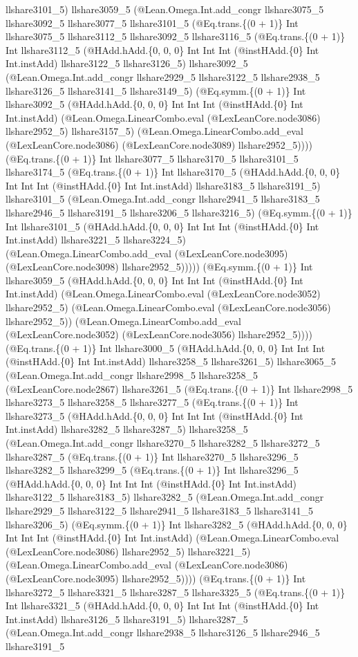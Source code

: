 \documentclass[11pt]{article}
\begin{document}
llshare3101\_5) llshare3059\_5 (@Lean.Omega.Int.add\_congr llshare3075\_5 llshare3092\_5 llshare3077\_5 llshare3101\_5 (@Eq.trans.\{(0 + 1)\} Int llshare3075\_5 llshare3112\_5 llshare3092\_5 llshare3116\_5 (@Eq.trans.\{(0 + 1)\} Int llshare3112\_5 (@HAdd.hAdd.\{0, 0, 0\} Int Int Int (@instHAdd.\{0\} Int Int.instAdd) llshare3122\_5 llshare3126\_5) llshare3092\_5 (@Lean.Omega.Int.add\_congr llshare2929\_5 llshare3122\_5 llshare2938\_5 llshare3126\_5 llshare3141\_5 llshare3149\_5) (@Eq.symm.\{(0 + 1)\} Int llshare3092\_5 (@HAdd.hAdd.\{0, 0, 0\} Int Int Int (@instHAdd.\{0\} Int Int.instAdd) (@Lean.Omega.LinearCombo.eval (@LexLeanCore.node3086) llshare2952\_5) llshare3157\_5) (@Lean.Omega.LinearCombo.add\_eval (@LexLeanCore.node3086) (@LexLeanCore.node3089) llshare2952\_5)))) (@Eq.trans.\{(0 + 1)\} Int llshare3077\_5 llshare3170\_5 llshare3101\_5 llshare3174\_5 (@Eq.trans.\{(0 + 1)\} Int llshare3170\_5 (@HAdd.hAdd.\{0, 0, 0\} Int Int Int (@instHAdd.\{0\} Int Int.instAdd) llshare3183\_5 llshare3191\_5) llshare3101\_5 (@Lean.Omega.Int.add\_congr llshare2941\_5 llshare3183\_5 llshare2946\_5 llshare3191\_5 llshare3206\_5 llshare3216\_5) (@Eq.symm.\{(0 + 1)\} Int llshare3101\_5 (@HAdd.hAdd.\{0, 0, 0\} Int Int Int (@instHAdd.\{0\} Int Int.instAdd) llshare3221\_5 llshare3224\_5) (@Lean.Omega.LinearCombo.add\_eval (@LexLeanCore.node3095) (@LexLeanCore.node3098) llshare2952\_5))))) (@Eq.symm.\{(0 + 1)\} Int llshare3059\_5 (@HAdd.hAdd.\{0, 0, 0\} Int Int Int (@instHAdd.\{0\} Int Int.instAdd) (@Lean.Omega.LinearCombo.eval (@LexLeanCore.node3052) llshare2952\_5) (@Lean.Omega.LinearCombo.eval (@LexLeanCore.node3056) llshare2952\_5)) (@Lean.Omega.LinearCombo.add\_eval (@LexLeanCore.node3052) (@LexLeanCore.node3056) llshare2952\_5)))) (@Eq.trans.\{(0 + 1)\} Int llshare3000\_5 (@HAdd.hAdd.\{0, 0, 0\} Int Int Int (@instHAdd.\{0\} Int Int.instAdd) llshare3258\_5 llshare3261\_5) llshare3065\_5 (@Lean.Omega.Int.add\_congr llshare2998\_5 llshare3258\_5 (@LexLeanCore.node2867) llshare3261\_5 (@Eq.trans.\{(0 + 1)\} Int llshare2998\_5 llshare3273\_5 llshare3258\_5 llshare3277\_5 (@Eq.trans.\{(0 + 1)\} Int llshare3273\_5 (@HAdd.hAdd.\{0, 0, 0\} Int Int Int (@instHAdd.\{0\} Int Int.instAdd) llshare3282\_5 llshare3287\_5) llshare3258\_5 (@Lean.Omega.Int.add\_congr llshare3270\_5 llshare3282\_5 llshare3272\_5 llshare3287\_5 (@Eq.trans.\{(0 + 1)\} Int llshare3270\_5 llshare3296\_5 llshare3282\_5 llshare3299\_5 (@Eq.trans.\{(0 + 1)\} Int llshare3296\_5 (@HAdd.hAdd.\{0, 0, 0\} Int Int Int (@instHAdd.\{0\} Int Int.instAdd) llshare3122\_5 llshare3183\_5) llshare3282\_5 (@Lean.Omega.Int.add\_congr llshare2929\_5 llshare3122\_5 llshare2941\_5 llshare3183\_5 llshare3141\_5 llshare3206\_5) (@Eq.symm.\{(0 + 1)\} Int llshare3282\_5 (@HAdd.hAdd.\{0, 0, 0\} Int Int Int (@instHAdd.\{0\} Int Int.instAdd) (@Lean.Omega.LinearCombo.eval (@LexLeanCore.node3086) llshare2952\_5) llshare3221\_5) (@Lean.Omega.LinearCombo.add\_eval (@LexLeanCore.node3086) (@LexLeanCore.node3095) llshare2952\_5)))) (@Eq.trans.\{(0 + 1)\} Int llshare3272\_5 llshare3321\_5 llshare3287\_5 llshare3325\_5 (@Eq.trans.\{(0 + 1)\} Int llshare3321\_5 (@HAdd.hAdd.\{0, 0, 0\} Int Int Int (@instHAdd.\{0\} Int Int.instAdd) llshare3126\_5 llshare3191\_5) llshare3287\_5 (@Lean.Omega.Int.add\_congr llshare2938\_5 llshare3126\_5 llshare2946\_5 llshare3191\_5 
\end{document}
